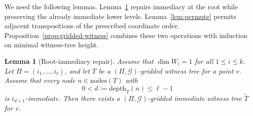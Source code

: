 \documentclass[10pt]{amsart}
\theoremstyle{plain}
\newtheorem{lemma}{Lemma}[section]
\theoremstyle{definition}
\providecommand{\cG}[0]{\ensuremath{\mathcal G}\xspace}
\let\leq\leqslant
\begin{document}
We need the following lemmas.
Lemma~\ref{lem:root-immediacy-repair} repairs immediacy at the root while preserving the already immediate lower levels. Lemma~\ref{lem:permute} permits adjacent transpositions of the prescribed coordinate order. Proposition~\ref{prop:gridded-witness} combines these two operations with induction on minimal witness-tree height.

\begin{lemma}[Root-immediacy repair]
\label{lem:root-immediacy-repair}
Assume that $\dim W_i=1$ for all $1\leq i\leq k$.
Let $\Pi=(i_1,\ldots,i_\ell)$, and let $T$ be a
$(\Pi,\cG)$-gridded witness tree for a point $v$.
Assume that every node $n\in \mathrm{nodes}(T)$ with
\[
  0<d:=\mathrm{depth}_T(n)\leq \ell-1
\]
is $i_{d+1}$-immediate.  Then there exists a
$(\Pi,\cG)$-gridded immediate witness tree $\widetilde T$ for $v$.
\end{lemma}
\end{document}
